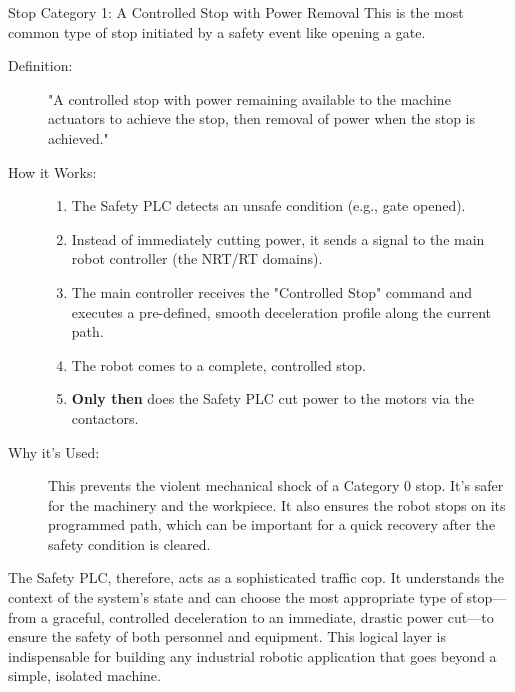 \begin{principlebox}{Stop Category 1: A Controlled Stop with Power Removal}
    This is the most common type of stop initiated by a safety event like opening a gate.
    \begin{description}
        \item[Definition:] "A controlled stop with power remaining available to the machine actuators to achieve the stop, then removal of power when the stop is achieved."
        \item[How it Works:]
            \begin{enumerate}
                \item The Safety PLC detects an unsafe condition (e.g., gate opened).
                \item Instead of immediately cutting power, it sends a signal to the main robot controller (the NRT/RT domains).
                \item The main controller receives the "Controlled Stop" command and executes a pre-defined, smooth deceleration profile along the current path.
                \item The robot comes to a complete, controlled stop.
                \item \textbf{Only then} does the Safety PLC cut power to the motors via the contactors.
            \end{enumerate}
        \item[Why it's Used:] This prevents the violent mechanical shock of a Category 0 stop. It's safer for the machinery and the workpiece. It also ensures the robot stops on its programmed path, which can be important for a quick recovery after the safety condition is cleared.
    \end{description}
\end{principlebox}


The Safety PLC, therefore, acts as a sophisticated traffic cop. It understands the context of the system's state and can choose the most appropriate type of stop—from a graceful, controlled deceleration to an immediate, drastic power cut—to ensure the safety of both personnel and equipment. This logical layer is indispensable for building any industrial robotic application that goes beyond a simple, isolated machine.

